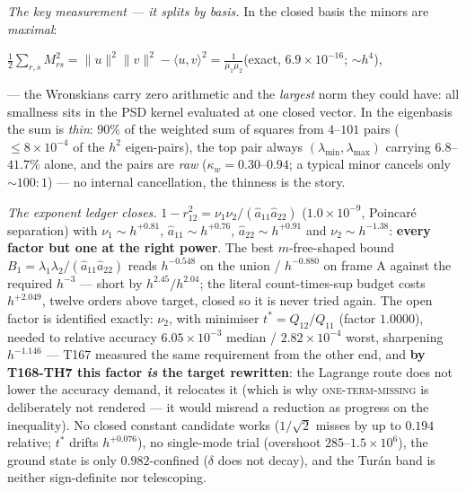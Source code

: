 \documentclass[11pt,a4paper]{article}
\begin{document}
\emph{The key measurement --- it splits by basis.} In the closed basis the
minors are \emph{maximal}:
\begin{keyeq}$\displaystyle
\tfrac12\sum_{r,s}M_{rs}^2=\|u\|^2\|v\|^2-\langle u,v\rangle^2
=\frac1{\mu_1\mu_2}$\quad(exact, $6.9\times10^{-16}$; $\sim h^4$),
\end{keyeq}
\noindent --- the Wronskians carry zero arithmetic and the \emph{largest}
norm they could have: all smallness sits in the PSD kernel evaluated at one
closed vector. In the eigenbasis the sum is \emph{thin}: $90\%$ of the
weighted sum of squares from $4$--$101$ pairs ($\le8\times10^{-4}$ of the
$h^2$ eigen-pairs), the top pair always $(\lambda_{\min},\lambda_{\max})$
carrying $6.8$--$41.7\%$ alone, and the pairs are \emph{raw}
($\kappa_w=0.30$--$0.94$; a typical minor cancels only ${\sim}100{:}1$) ---
no internal cancellation, the thinness is the story.

\emph{The exponent ledger closes.} $1-r_{12}^2=\nu_1\nu_2/(\hat a_{11}\hat
a_{22})$ ($1.0\times10^{-9}$, Poincar\'e separation) with $\nu_1\sim
h^{+0.81}$, $\hat a_{11}\sim h^{+0.76}$, $\hat a_{22}\sim h^{+0.91}$ and
$\nu_2\sim h^{-1.38}$: \textbf{every factor but one at the right power}.
The best $m$-free-shaped bound $B_1=\lambda_1\lambda_2/(\hat a_{11}\hat
a_{22})$ reads $h^{-0.548}$ on the union / $h^{-0.880}$ on frame A against
the required $h^{-3}$ --- short by $h^{2.45}/h^{2.04}$; the literal
count-times-sup budget costs $h^{+2.049}$, twelve orders above target,
closed so it is never tried again. The open factor is identified exactly:
$\nu_2$, with minimiser $t^*=Q_{12}/Q_{11}$ (factor $1.0000$), needed to
relative accuracy $6.05\times10^{-3}$ median / $2.82\times10^{-4}$ worst,
sharpening $h^{-1.146}$ --- T167 measured the same requirement from the
other end, and \textbf{by T168-TH7 this factor \emph{is} the target
rewritten}: the Lagrange route does not lower the accuracy demand, it
relocates it (which is why \textsc{one-term-missing} is deliberately not
rendered --- it would misread a reduction as progress on the inequality).
No closed constant candidate works ($1/\sqrt2$ misses by up to $0.194$
relative; $t^*$ drifts $h^{+0.076}$), no single-mode trial (overshoot
$285$--$1.5\times10^{6}$), the ground state is only $0.982$-confined
($\delta$ does not decay), and the Tur\'an band is neither sign-definite
nor telescoping.
\end{document}
